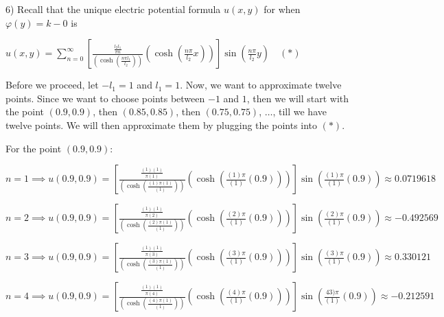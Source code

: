 \documentclass[executivepaper]{article}
\begin{document}
\begin{flushleft}

6) Recall that the unique electric potential formula $u(x,y)$ for when $\varphi(y)=k-{0}$ is

\begin{center}

$u(x,y)=\sum_{n=0}^{\infty} \left[\frac{\frac{l_{2} l_{1}}{\pi n}}{\left(\cosh\left(\frac{n \pi l_{1}}{l_{2}}\right)\right)} \left(\cosh\left(\frac{n \pi}{l_{2}} x\right)\right)\right] \sin\left(\frac{n \pi}{l_{2}} y\right) \quad (*)$

\end{center}

Before we proceed, let $-l_{1}=1$ and $l_{1}=1$. Now, we want to approximate twelve points. Since we want to choose points between $-1$ and $1$, then we will start with the point $(0.9,0.9)$, then $(0.85,0.85)$, then $(0.75,0.75)$, $\ldots$, till we have twelve points. We will then approximate them by plugging the points into $(*)$. 

\vspace{2mm}

For the point $(0.9,0.9)$:

\vspace{2mm}

$n=1 \implies u(0.9,0.9)=\left[\frac{\frac{(1) (1)}{\pi (1)}}{\left(\cosh\left(\frac{(1) \pi (1)}{(1)}\right)\right)} \left(\cosh\left(\frac{(1) \pi}{(1)} (0.9)\right)\right)\right] \sin\left(\frac{(1) \pi}{(1)} (0.9)\right) \approx 0.0719618$

\vspace{2mm}

$n=2 \implies u(0.9,0.9)=\left[\frac{\frac{(1) (1)}{\pi (2)}}{\left(\cosh\left(\frac{(2) \pi (1)}{(1)}\right)\right)} \left(\cosh\left(\frac{(2) \pi}{(1)} (0.9)\right)\right)\right] \sin\left(\frac{(2) \pi}{(1)} (0.9)\right) \approx -0.492569$

\vspace{2mm}

$n=3 \implies u(0.9,0.9)=\left[\frac{\frac{(1) (1)}{\pi (3)}}{\left(\cosh\left(\frac{(3) \pi (1)}{(1)}\right)\right)} \left(\cosh\left(\frac{(3) \pi}{(1)} (0.9)\right)\right)\right] \sin\left(\frac{(3) \pi}{(1)} (0.9)\right) \approx 0.330121$

\vspace{2mm}

$n=4 \implies u(0.9,0.9)=\left[\frac{\frac{(1) (1)}{\pi (4)}}{\left(\cosh\left(\frac{(4) \pi (1)}{(1)}\right)\right)} \left(\cosh\left(\frac{(4) \pi}{(1)} (0.9)\right)\right)\right] \sin\left(\frac{43) \pi}{(1)} (0.9)\right) \approx -0.212591$


\end{flushleft}
\end{document}
